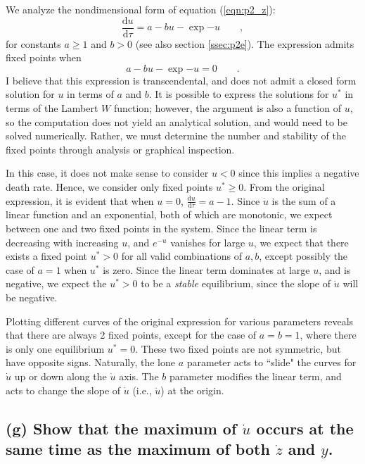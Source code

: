 \documentclass[draft]{agujournal2019}
\begin{document}
We analyze the nondimensional form of equation (\ref{eqn:p2_z}):
\begin{equation*}
    \frac{\mathrm{d}u}{\mathrm{d}\tau} = a - b u - \exp{-u} \qquad ,
\end{equation*}
for constants $a\geq1$ and $b>0$ (see also section \ref{ssec:p2e}). The expression admits fixed points when 
\begin{equation*}
    a - b u - \exp{-u} = 0 \qquad .
\end{equation*}
I believe that this expression is transcendental, and does not admit a closed form solution for $u$ in terms of $a$ and $b$. It is possible to express the solutions for $u^*$ in terms of the Lambert $W$ function; however, the argument is also a function of $u$, so the computation does not yield an analytical solution, and would need to be solved numerically. Rather, we must determine the number and stability of the fixed points through analysis or graphical inspection. 
\par
In this case, it does not make sense to consider $u<0$ since this implies a negative death rate. Hence, we consider only fixed points $u^*\geq0$. From the original expression, it is evident that when $u=0$, $\frac{\mathrm{d}u}{\mathrm{d}\tau} = a - 1$. Since $\dot u$ is the sum of a linear function and an exponential, both of which are monotonic, we expect between one and two fixed points in the system. Since the linear term is decreasing with increasing $u$, and $e^{-u}$ vanishes for large $u$, we expect that there exists a fixed point $u^*>0$ for all valid combinations of $a,b$, except possibly the case of $a=1$ when $u^*$ is zero. Since the linear term dominates at large $u$, and is negative, we expect the $u^*>0$ to be a \emph{stable} equilibrium, since the slope of $\dot{u}$ will be negative. 
\par
Plotting different curves of the original expression for various parameters reveals that there are always 2 fixed points, except for the case of $a=b=1$, where there is only one equilibrium $u^*=0$. These two fixed points are not symmetric, but have opposite signs. Naturally, the lone $a$ parameter acts to ``slide" the curves for $\dot u$ up or down along the $\dot u$ axis. The $b$ parameter modifies the linear term, and acts to change the slope of $\dot u$ (i.e., $\ddot u$) at the origin. 



\subsection{(g) Show that the maximum of $\dot u$ occurs at the same time as the maximum of both $\dot z$ and $y$. }
\label{ssec:p2g}
\end{document}
